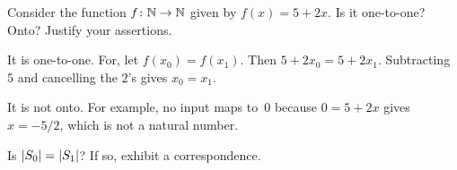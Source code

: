 \documentclass[noanswers, nolegalese, 11pt]{examjh}
\begin{document}
\begin{questions}
\question
Consider the function $\mbox{$f\colon \mathbb{N}\to \mathbb{N}$}$ given by
$f(x)=5+2x$.
Is it one-to-one?  Onto?
Justify your assertions.
\begin{solution}
It is one-to-one.
For, let $f(x_0)=f(x_1)$.
Then $5+2x_0=5+2x_1$. 
Subtracting $5$ and cancelling the $2$'s gives $x_0=x_1$.

It is not onto.
For example, no input maps to~$0$
because $0=5+2x$ gives $x=-5/2$, which is not a natural number. 
\end{solution}

\question
Is $\lvert S_0\rvert=\lvert S_1\rvert$?
If so, exhibit a correspondence.
\begin{solution}
\end{solution}



\end{questions}
\end{document}
